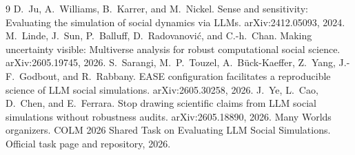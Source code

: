 \documentclass[10pt]{article}
\begin{document}
\begin{thebibliography}{9}
\small
{} D.~Ju, A.~Williams, B.~Karrer, and M.~Nickel. Sense and sensitivity: Evaluating the simulation of social dynamics via LLMs. arXiv:2412.05093, 2024.
 M.~Linde, J.~Sun, P.~Balluff, D.~Radovanovi\'c, and C.-h.~Chan. Making uncertainty visible: Multiverse analysis for robust computational social science. arXiv:2605.19745, 2026.
 S.~Sarangi, M.~P.~Touzel, A.~B\"uck-Kaeffer, Z.~Yang, J.-F.~Godbout, and R.~Rabbany. EASE configuration facilitates a reproducible science of LLM social simulations. arXiv:2605.30258, 2026.
 J.~Ye, L.~Cao, D.~Chen, and E.~Ferrara. Stop drawing scientific claims from LLM social simulations without robustness audits. arXiv:2605.18890, 2026.
 Many Worlds organizers. COLM 2026 Shared Task on Evaluating LLM Social Simulations. Official task page and repository, 2026.
\end{thebibliography}
\end{document}
